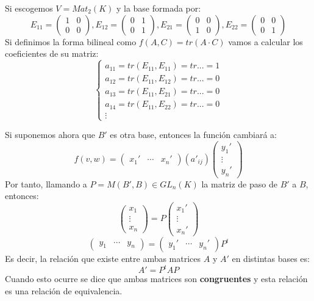 \documentclass[10pt,a4paper,openright]{book}
\begin{document}
Si escogemos $V=Mat_2(K)$ y la base formada por:
$$E_{11}=\begin{pmatrix} 1 & 0 \\ 0 & 0\end{pmatrix}, E_{12}=\begin{pmatrix} 0 & 1 \\ 0 & 1\end{pmatrix}, E_{21}=\begin{pmatrix} 0 & 0 \\ 1 & 0\end{pmatrix}, E_{22}=\begin{pmatrix} 0 & 0 \\ 0 & 1\end{pmatrix}$$
Si definimos la forma bilineal como $f(A,C)=tr(A\cdot C)$ vamos a  calcular los coeficientes de su matriz:
$$\begin{cases} a_{11} = tr(E_{11},E_{11})=tr... = 1\\
a_{12} = tr(E_{11}, E_{12})= tr ... =0 \\ a_{13} = tr(E_{11},E_{21})=tr... = 0 \\ a_{14} = tr(E_{11},E_{22})=tr... = 0 \\ \vdots\end{cases}$$

Si suponemos ahora que $B'$ es otra base, entonces la función cambiará a:
$$f(v,w)=\begin{pmatrix} x_1' & \cdots & x_n'\end{pmatrix}(a'_{ij})\begin{pmatrix} y_1' \\ \vdots \\ y_n' \end{pmatrix} $$
Por tanto, llamando a $P=M(B',B)\in GL_n(K)$ la matriz de paso de $B'$ a $B$, entonces:
$$\begin{pmatrix} x_1 \\ \vdots \\ x_n\end{pmatrix}=P\begin{pmatrix} x_1' \\ \vdots \\ x_n' \end{pmatrix} $$
$$\begin{pmatrix} y_1 & \cdots & y_n\end{pmatrix}=\begin{pmatrix} y_1' & \cdots & y_n' \end{pmatrix} P^t$$
Es decir, la relación que existe entre ambas matrices $A$ y $A'$ en distintas bases es:
$$A'=P^tAP$$
Cuando esto ocurre se dice que ambas matrices son \textbf{congruentes} y esta relación es una relación de equivalencia.
\end{document}
